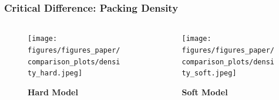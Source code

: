 \documentclass[10pt,t]{beamer}
\begin{document}



\begin{frame}
    \frametitle{Critical Difference: Packing Density}

    \begin{columns}
        \begin{column}{0.5\textwidth}
            \begin{figure}
                \centering
                \texttt{[image: figures/figures\_paper/comparison\_plots/density\_hard.jpeg]}
                \caption*{\textbf{Hard Model}}
            \end{figure}
        \end{column}

        \begin{column}{0.5\textwidth}
            \begin{figure}
                \centering
                \texttt{[image: figures/figures\_paper/comparison\_plots/density\_soft.jpeg]}
                \caption*{\textbf{Soft Model}}
            \end{figure}
        \end{column}
    \end{columns}

\end{frame}
\end{document}
